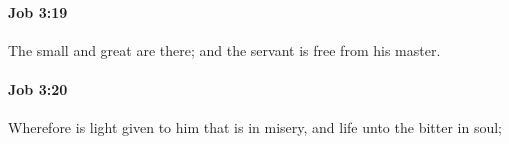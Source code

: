 		\paragraph{Job 3:19} %
			\label{JOB-3-19}

			The small and great are there; and the servant is free from his master.


		\paragraph{Job 3:20} %
			\label{JOB-3-20}

			Wherefore is light given to him that is in misery, and life unto the bitter in soul;


